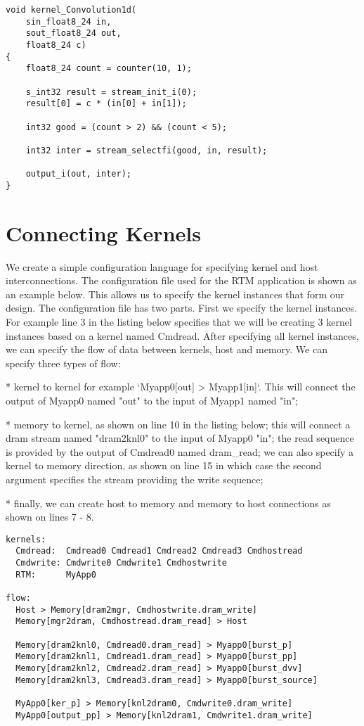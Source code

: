 \documentclass[conference]{IEEEtran}
\begin{document}
\begin{lstlisting}
void kernel_Convolution1d(
    sin_float8_24 in,
    sout_float8_24 out,
    float8_24 c)
{
    float8_24 count = counter(10, 1);

    s_int32 result = stream_init_i(0);
	result[0] = c * (in[0] + in[1]);

    int32 good = (count > 2) && (count < 5);

    int32 inter = stream_selectfi(good, in, result);

    output_i(out, inter);
}

\end{lstlisting}

\section{Connecting Kernels}

We create a simple configuration language for specifying kernel and
host interconnections. The configuration file used for the RTM
application is shown as an example below. This allows us to specify
the kernel instances that form our design. The configuration file has
two parts. First we specify the kernel instances. For example line 3
in the listing below specifies that we will be creating 3 kernel
instances based on a kernel named Cmdread. After specifying all kernel
instances, we can specify the flow of data between kernels, host and
memory. We can specify three types of flow:

* kernel to kernel for example `Myapp0[out] > Myapp1[in]`. This will
  connect the output of Myapp0 named "out" to the input of Myapp1
  named "in";

* memory to kernel, as shown on line 10 in the listing below; this
  will connect a dram stream named "dram2knl0" to the input of Myapp0
  "in"; the read sequence is provided by the output of Cmdread0 named
  dram\_read; we can also specify a kernel to memory direction, as
  shown on line 15 in which case the second argument specifies the
  stream providing the write sequence;

* finally, we can create host to memory and memory to host connections
  as shown on lines 7 - 8.

\lstset{style=MaxCconf}

\begin{lstlisting}
kernels:
  Cmdread:  Cmdread0 Cmdread1 Cmdread2 Cmdread3 Cmdhostread
  Cmdwrite: Cmdwrite0 Cmdwrite1 Cmdhostwrite
  RTM:      MyApp0

flow:
  Host > Memory[dram2mgr, Cmdhostwrite.dram_write]
  Memory[mgr2dram, Cmdhostread.dram_read] > Host

  Memory[dram2knl0, Cmdread0.dram_read] > Myapp0[burst_p]
  Memory[dram2knl1, Cmdread1.dram_read] > Myapp0[burst_pp]
  Memory[dram2knl2, Cmdread2.dram_read] > Myapp0[burst_dvv]
  Memory[dram2knl3, Cmdread3.dram_read] > Myapp0[burst_source]

  MyApp0[ker_p] > Memory[knl2dram0, Cmdwrite0.dram_write]
  MyApp0[output_pp] > Memory[knl2dram1, Cmdwrite1.dram_write]
\end{lstlisting}
\end{document}
